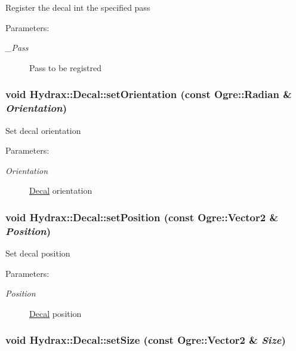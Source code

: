 Register the decal int the specified pass \begin{Desc}
\item[Parameters:]
\begin{description}
\item[{\em \_\-Pass}]Pass to be registred \end{description}
\end{Desc}
\hypertarget{class_hydrax_1_1_decal_5dc16dca9688e2bb46f0770a7375902c}{
\subsubsection[{setOrientation}]{\setlength{\rightskip}{0pt plus 5cm}void Hydrax::Decal::setOrientation (const Ogre::Radian \& {\em Orientation})}}
\label{class_hydrax_1_1_decal_5dc16dca9688e2bb46f0770a7375902c}


Set decal orientation \begin{Desc}
\item[Parameters:]
\begin{description}
\item[{\em Orientation}]\hyperlink{class_hydrax_1_1_decal}{Decal} orientation \end{description}
\end{Desc}
\hypertarget{class_hydrax_1_1_decal_53da5b1cb4fc6d8cd470d23255cbcc7a}{
\subsubsection[{setPosition}]{\setlength{\rightskip}{0pt plus 5cm}void Hydrax::Decal::setPosition (const Ogre::Vector2 \& {\em Position})}}
\label{class_hydrax_1_1_decal_53da5b1cb4fc6d8cd470d23255cbcc7a}


Set decal position \begin{Desc}
\item[Parameters:]
\begin{description}
\item[{\em Position}]\hyperlink{class_hydrax_1_1_decal}{Decal} position \end{description}
\end{Desc}
\hypertarget{class_hydrax_1_1_decal_e48299846460ba4022683faba3f826be}{
\subsubsection[{setSize}]{\setlength{\rightskip}{0pt plus 5cm}void Hydrax::Decal::setSize (const Ogre::Vector2 \& {\em Size})}}
\label{class_hydrax_1_1_decal_e48299846460ba4022683faba3f826be}


